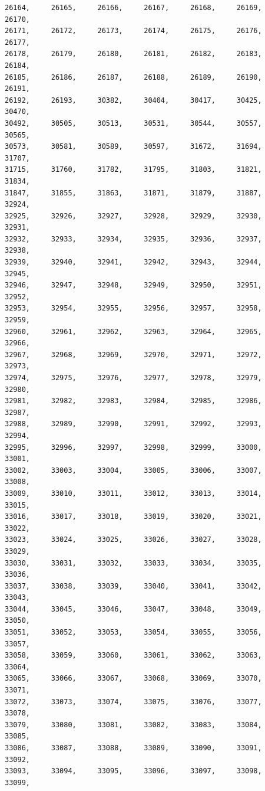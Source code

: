 \documentclass[a4paper,11pt]{report}
\begin{document}
\begin{verbatim}
26164,     26165,     26166,     26167,     26168,     26169,     26170,     
26171,     26172,     26173,     26174,     26175,     26176,     26177,     
26178,     26179,     26180,     26181,     26182,     26183,     26184,     
26185,     26186,     26187,     26188,     26189,     26190,     26191,     
26192,     26193,     30382,     30404,     30417,     30425,     30470,     
30492,     30505,     30513,     30531,     30544,     30557,     30565,     
30573,     30581,     30589,     30597,     31672,     31694,     31707,     
31715,     31760,     31782,     31795,     31803,     31821,     31834,     
31847,     31855,     31863,     31871,     31879,     31887,     32924,     
32925,     32926,     32927,     32928,     32929,     32930,     32931,     
32932,     32933,     32934,     32935,     32936,     32937,     32938,     
32939,     32940,     32941,     32942,     32943,     32944,     32945,     
32946,     32947,     32948,     32949,     32950,     32951,     32952,     
32953,     32954,     32955,     32956,     32957,     32958,     32959,     
32960,     32961,     32962,     32963,     32964,     32965,     32966,     
32967,     32968,     32969,     32970,     32971,     32972,     32973,     
32974,     32975,     32976,     32977,     32978,     32979,     32980,     
32981,     32982,     32983,     32984,     32985,     32986,     32987,     
32988,     32989,     32990,     32991,     32992,     32993,     32994,     
32995,     32996,     32997,     32998,     32999,     33000,     33001,     
33002,     33003,     33004,     33005,     33006,     33007,     33008,     
33009,     33010,     33011,     33012,     33013,     33014,     33015,     
33016,     33017,     33018,     33019,     33020,     33021,     33022,     
33023,     33024,     33025,     33026,     33027,     33028,     33029,     
33030,     33031,     33032,     33033,     33034,     33035,     33036,     
33037,     33038,     33039,     33040,     33041,     33042,     33043,     
33044,     33045,     33046,     33047,     33048,     33049,     33050,     
33051,     33052,     33053,     33054,     33055,     33056,     33057,     
33058,     33059,     33060,     33061,     33062,     33063,     33064,     
33065,     33066,     33067,     33068,     33069,     33070,     33071,     
33072,     33073,     33074,     33075,     33076,     33077,     33078,     
33079,     33080,     33081,     33082,     33083,     33084,     33085,     
33086,     33087,     33088,     33089,     33090,     33091,     33092,     
33093,     33094,     33095,     33096,     33097,     33098,     33099,     

\end{verbatim}
\end{document}
